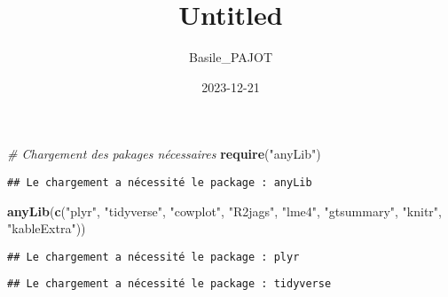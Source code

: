 \documentclass[
]{article}
\title{Untitled}
\author{Basile\_PAJOT}
\date{2023-12-21}
\newenvironment{Shaded}{\begin{snugshade}}{\end{snugshade}}
\newcommand{\CommentTok}[1]{\textcolor[rgb]{0.56,0.35,0.01}{\textit{#1}}}
\newcommand{\FunctionTok}[1]{\textcolor[rgb]{0.13,0.29,0.53}{\textbf{#1}}}
\newcommand{\NormalTok}[1]{#1}
\newcommand{\StringTok}[1]{\textcolor[rgb]{0.31,0.60,0.02}{#1}}
\begin{document}
\maketitle

\begin{Shaded}
\begin{Highlighting}[]
\CommentTok{\# Chargement des pakages nécessaires}
\FunctionTok{require}\NormalTok{(}\StringTok{"anyLib"}\NormalTok{)}
\end{Highlighting}
\end{Shaded}

\begin{verbatim}
## Le chargement a nécessité le package : anyLib
\end{verbatim}

\begin{Shaded}
\begin{Highlighting}[]
\FunctionTok{anyLib}\NormalTok{(}\FunctionTok{c}\NormalTok{(}\StringTok{"plyr"}\NormalTok{, }\StringTok{"tidyverse"}\NormalTok{, }\StringTok{"cowplot"}\NormalTok{, }\StringTok{"R2jags"}\NormalTok{, }\StringTok{"lme4"}\NormalTok{, }\StringTok{"gtsummary"}\NormalTok{, }\StringTok{"knitr"}\NormalTok{, }\StringTok{"kableExtra"}\NormalTok{))}
\end{Highlighting}
\end{Shaded}

\begin{verbatim}
## Le chargement a nécessité le package : plyr
\end{verbatim}

\begin{verbatim}
## Le chargement a nécessité le package : tidyverse
\end{verbatim}
\end{document}
